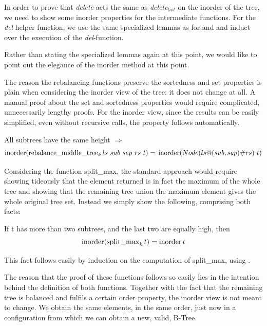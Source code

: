 In order to prove that \textit{delete} acts the same as
\textit{delete}$_{list}$ on the inorder of the tree,
we need to show some inorder properties for the intermediate functions.
For the \textit{del} helper function, 
we use the same specialized lemmas
as for  and 
and induct over the execution of the \textit{del}-function.

Rather than stating the specialized lemmas again at this point, we would like to point
out the elegance of the inorder method at this point.

The reason the rebalancing functions preserve the sortedness and set properties
is plain when considering the inorder view of the tree:
it does not change at all.
A manual proof about the set and sortedness properties
would require complicated, unnecessarily lengthy proofs.
For the inorder view, 
since the results can be easily simplified, even without recursive calls,
the property follows automatically.

\begin{lemma}
    \label{lem:rebalance-inorder}
    All subtrees have the same height $\Longrightarrow$ \\
    \begin{equation*}
    \inorder (\rebalancemt_k ls\ sub\ sep\ rs\ t) =\\
    \inorder (Node (ls@(sub,sep)\#rs)\ t)
    \end{equation*}
\end{lemma}

Considering the function split\_max,
the standard approach would require showing
tideously that the element returned is in fact the maximum of the whole tree
and showing that the remaining tree union the maximum element
gives the whole original tree set.
Instead we simply show the following,
comprising both facts:

\begin{lemma}
    \label{lem:splitmax-inorder}
    If t has more than two subtrees, and the last two are equally high, then
    \begin{equation*}
    \operatorname{inorder} (\operatorname{split\_max}_k t) = \operatorname{inorder} t
    \end{equation*}
\end{lemma}

This fact follows easily by induction on the computation of split\_max,
using .

The reason that the proof of these functions follows so easily
lies in the intention behind the definition of both functions.
Together with the fact that the remaining tree is balanced and
fulfils a certain order property, the inorder view
is not meant to change.
We obtain the same elements, in the same order,
just now in a configuration from which we can obtain
a new, valid, B-Tree.


